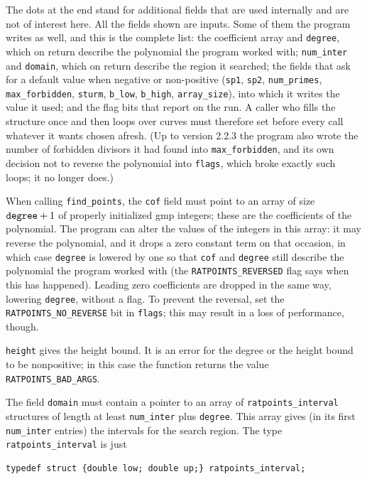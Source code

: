 \documentclass[12pt,a4paper,oneside]{amsart}
\begin{document}
The dots at the end stand for additional fields that are used internally
and are not of interest here. All the fields shown are inputs. Some of
them the program writes as well, and this is the complete list: the
coefficient array and \texttt{degree}, which on return describe the
polynomial the program worked with; \texttt{num\_inter} and
\texttt{domain}, which on return describe the region it searched; the
fields that ask for a default value when negative or non-positive
(\texttt{sp1}, \texttt{sp2}, \texttt{num\_primes}, \texttt{max\_forbidden},
\texttt{sturm}, \texttt{b\_low}, \texttt{b\_high}, \texttt{array\_size}),
into which it writes the value it used; and the flag bits that report on
the run. A caller who fills the structure once and then loops over curves
must therefore set before every call whatever it wants chosen afresh.
(Up to version 2.2.3 the program also wrote the number of forbidden
divisors it had found into \texttt{max\_forbidden}, and its own decision
not to reverse the polynomial into \texttt{flags}, which broke exactly
such loops; it no longer does.)

When calling \texttt{find\_points}, the
\texttt{cof} field must point to an array of size $\text{\texttt{degree}} + 1$
of properly initialized gmp integers; these are the coefficients of
the polynomial. The program can alter the values of the integers in this
array: it may reverse the polynomial, and it drops a zero constant term
on that occasion, in which case \texttt{degree} is lowered by one so that
\texttt{cof} and \texttt{degree} still describe the polynomial the program
worked with (the \texttt{RATPOINTS\_REVERSED} flag says when this has
happened). Leading zero coefficients are dropped in the same way, lowering
\texttt{degree}, without a flag.
To prevent the reversal, set the \texttt{RATPOINTS\_NO\_REVERSE} bit
in \texttt{flags}; this may result in a loss of performance, though.

\texttt{height} gives the height bound. It is an error for the
degree or the height bound to be nonpositive; in this case the function
returns the value \texttt{RATPOINTS\_BAD\_ARGS}.

The field \texttt{domain} must contain a pointer to an array of
\texttt{ratpoints\_interval} structures of length at least \texttt{num\_inter}
plus \texttt{degree}. This array gives (in its first \texttt{num\_inter} entries)
the intervals for the search region. The type \texttt{ratpoints\_interval}
is just

\begin{verbatim}
typedef struct {double low; double up;} ratpoints_interval;
\end{verbatim}
\end{document}
